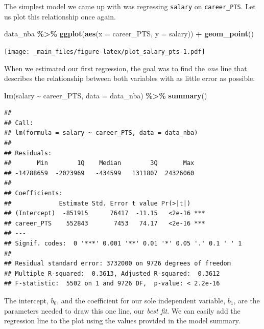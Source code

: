 \documentclass[
]{book}
\newenvironment{Shaded}{\begin{snugshade}}{\end{snugshade}}
\newcommand{\AttributeTok}[1]{\textcolor[rgb]{0.13,0.29,0.53}{#1}}
\newcommand{\FunctionTok}[1]{\textcolor[rgb]{0.13,0.29,0.53}{\textbf{#1}}}
\newcommand{\NormalTok}[1]{#1}
\newcommand{\SpecialCharTok}[1]{\textcolor[rgb]{0.81,0.36,0.00}{\textbf{#1}}}
\begin{document}
The simplest model we came up with was regressing \texttt{salary} on \texttt{career\_PTS}.
Let us plot this relationship once again.

\begin{Shaded}
\begin{Highlighting}[]
\NormalTok{data\_nba }\SpecialCharTok{\%\textgreater{}\%} 
  \FunctionTok{ggplot}\NormalTok{(}\FunctionTok{aes}\NormalTok{(}\AttributeTok{x =}\NormalTok{ career\_PTS, }\AttributeTok{y =}\NormalTok{ salary)) }\SpecialCharTok{+}
  \FunctionTok{geom\_point}\NormalTok{()}
\end{Highlighting}
\end{Shaded}

\texttt{[image: \_main\_files/figure-latex/plot\_salary\_pts-1.pdf]}

When we estimated our first regression, the goal was to find the \emph{one} line
that describes the relationship between both variables with as little error as
possible.

\begin{Shaded}
\begin{Highlighting}[]
\FunctionTok{lm}\NormalTok{(salary }\SpecialCharTok{\textasciitilde{}}\NormalTok{ career\_PTS, }\AttributeTok{data =}\NormalTok{ data\_nba) }\SpecialCharTok{\%\textgreater{}\%} 
  \FunctionTok{summary}\NormalTok{()}
\end{Highlighting}
\end{Shaded}

\begin{verbatim}
## 
## Call:
## lm(formula = salary ~ career_PTS, data = data_nba)
## 
## Residuals:
##       Min        1Q    Median        3Q       Max 
## -14788659  -2023969   -434599   1311807  24326060 
## 
## Coefficients:
##             Estimate Std. Error t value Pr(>|t|)    
## (Intercept)  -851915      76417  -11.15   <2e-16 ***
## career_PTS    552843       7453   74.17   <2e-16 ***
## ---
## Signif. codes:  0 '***' 0.001 '**' 0.01 '*' 0.05 '.' 0.1 ' ' 1
## 
## Residual standard error: 3732000 on 9726 degrees of freedom
## Multiple R-squared:  0.3613, Adjusted R-squared:  0.3612 
## F-statistic:  5502 on 1 and 9726 DF,  p-value: < 2.2e-16
\end{verbatim}

The intercept, \(b_0\), and the coefficient for our sole independent variable,
\(b_1\), are the parameters needed to draw this one line, our \emph{best fit}. We can
easily add the regression line to the plot using the values provided in the
model summary.
\end{document}
